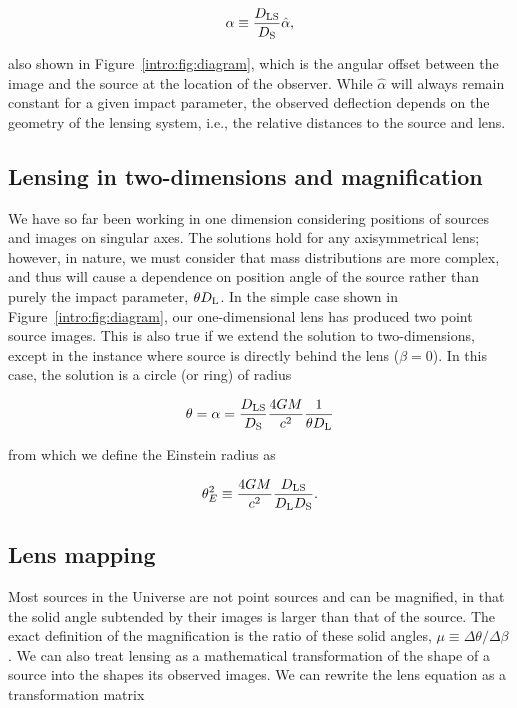 \begin{equation}
\alpha \equiv  \frac{D_\mathrm{LS}}{D_\mathrm{S}} \hat\alpha,
\label{intro:eqn:dlsds}
\end{equation}

\noindent also shown in Figure~\ref{intro:fig:diagram}, which is the angular offset between the image and the source at the location of the observer. While $\hat\alpha$ will always remain constant for a given impact parameter, the observed deflection depends on the geometry of the lensing system, i.e., the relative distances to the source and lens.

\subsection{Lensing in two-dimensions and magnification}
\label{intro:sec:magnification}

We have so far been working in one dimension considering positions of sources and images on singular axes. The solutions hold for any axisymmetrical lens; however, in nature, we must consider that mass distributions are more complex, and thus will cause a dependence on position angle of the source rather than purely the impact parameter, $\theta D_\mathrm{L}$. In the simple case shown in Figure~\ref{intro:fig:diagram}, our one-dimensional lens has produced two point source images. This is also true if we extend the solution to two-dimensions, except in the instance where source is directly behind the lens ($\beta=0$). In this case, the solution is a circle (or ring) of radius

\begin{equation}
\theta = \alpha = \frac{D_\mathrm{LS}}{D_\mathrm{S}} \frac{4GM}{c^2} \frac{1}{\theta D_\mathrm{L}}
\end{equation} 

\noindent from which we define the Einstein radius as

\begin{equation}
\theta_E^2 \equiv \frac{4GM}{c^2} \frac{D_\mathrm{LS}}{D_\mathrm{L}D_\mathrm{S}}.
\label{intro:eqn:einstein_radius}
\end{equation}

\subsection{Lens mapping}

Most sources in the Universe are not point sources and can be magnified, in that the solid angle subtended by their images is larger than that of the source. The exact definition of the magnification is the ratio of these solid angles,
$\mu \equiv \Delta \theta/\Delta \beta$. We can also treat lensing as a mathematical transformation of the shape of a source into the shapes its observed images. We can rewrite the lens equation as a transformation matrix

